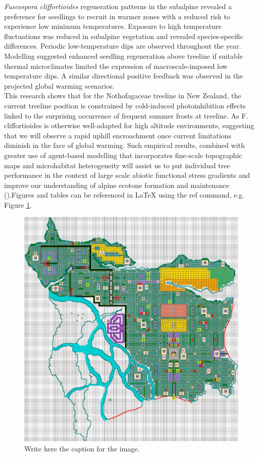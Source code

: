 \documentclass[12pt]{article}
\begin{document}
\noindent \textit{Fuscospora cliffortioides} regeneration patterns in the subalpine revealed a preference for seedlings to recruit in warmer zones with a reduced risk to experience low minimum temperatures. Exposure to high temperature fluctuations was reduced in subalpine vegetation and revealed species-specific differences. Periodic low-temperature dips are observed throughout the year. Modelling suggested enhanced seedling regeneration above treeline if suitable thermal microclimates limited the expression of macroscale-imposed low temperature dips. A similar directional positive feedback was observed in the projected global warming scenarios.\\
\indent This research shows that for the Nothofagaceae treeline in New Zealand, the current treeline position is constrained by cold-induced photoinhibition effects linked to the surprising occurrence of frequent summer frosts at treeline. As F. cliffortioides is otherwise well-adapted for high altitude environments, suggesting that we will observe a rapid uphill encroachment once current limitations diminish in the face of global warming. Such empirical results, combined with greater use of agent-based modelling that incorporates fine-scale topographic maps and microhabitat heterogeneity will assist us to put individual tree performance in the context of large scale abiotic functional stress gradients and improve our understanding of alpine ecotone formation and maintenance (\cite{barnas_comparison_2019}).Figures and tables can be referenced in LaTeX using the ref command, e.g. Figure \ref{fig:leiden}. 


\begin{figure}[ht]  %
\centering %
\includegraphics[scale=0.2]{analysis/figures/Leiden_8.jpg}
\caption{Write here the caption for the image.}
\label{fig:leiden}
\end{figure}
\end{document}

